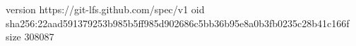 version https://git-lfs.github.com/spec/v1
oid sha256:22aad591379253b985b5ff985d902686c5bb36b95e8a0b3fb0235c28b41c166f
size 308087
